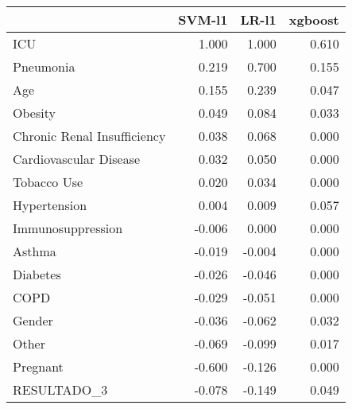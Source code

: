 \begin{tabular}{lrrr}
\toprule
{} &  SVM-l1 &  LR-l1 &  xgboost \\
\midrule
ICU                         &   1.000 &  1.000 &    0.610 \\
Pneumonia                   &   0.219 &  0.700 &    0.155 \\
Age                         &   0.155 &  0.239 &    0.047 \\
Obesity                     &   0.049 &  0.084 &    0.033 \\
Chronic Renal Insufficiency &   0.038 &  0.068 &    0.000 \\
Cardiovascular Disease      &   0.032 &  0.050 &    0.000 \\
Tobacco Use                 &   0.020 &  0.034 &    0.000 \\
Hypertension                &   0.004 &  0.009 &    0.057 \\
Immunosuppression           &  -0.006 &  0.000 &    0.000 \\
Asthma                      &  -0.019 & -0.004 &    0.000 \\
Diabetes                    &  -0.026 & -0.046 &    0.000 \\
COPD                        &  -0.029 & -0.051 &    0.000 \\
Gender                      &  -0.036 & -0.062 &    0.032 \\
Other                       &  -0.069 & -0.099 &    0.017 \\
Pregnant                    &  -0.600 & -0.126 &    0.000 \\
RESULTADO\_3                 &  -0.078 & -0.149 &    0.049 \\
\bottomrule
\end{tabular}
